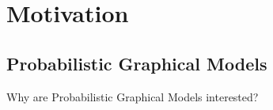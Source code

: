 \scriptsize
\section{Motivation}
\scriptsize
\subsection{Probabilistic Graphical Models}
{ 
  \begin{frame}
    \begin{center}
      {\large Why are Probabilistic Graphical Models interested?}
    \end{center}
  \end{frame}
}


